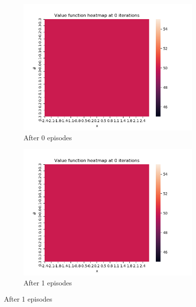 \documentclass[a4paper]{article}
\begin{document}
\begin{figure}[h!]
    \centering
    \begin{subfigure}[b]{0.4\textwidth}
        \centering
        \includegraphics[width=\textwidth]{Heatmap_0.png}
        \caption{After 0 episodes}
    \end{subfigure}
    \centering
    \begin{subfigure}[b]{0.4\textwidth}
        \centering
        \includegraphics[width=\textwidth]{Heatmap_0.png}
        \caption{After 1 episodes}
    \end{subfigure}


\end{figure}
\end{document}
